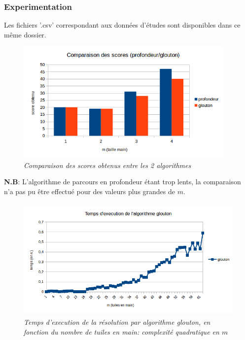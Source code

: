 \documentclass[10pt]{article}
\begin{document}
      \subsubsection{Experimentation}
	Les fichiers '.csv' correspondant aux données d'études sont disponibles dans ce même dossier.
	\begin{figure}[H]
	  \begin{center}
	    \includegraphics[height=6cm,keepaspectratio]{./comparaison.png}
	  \end{center}
	  \caption{\textit{Comparaison des scores obtenus entre les 2 algorithmes}}
	\end{figure}
	\textbf{N.B}: L'algorithme de parcours en profondeur étant trop lents, la comparaison n'a pas pu être effectué pour des valeurs plus grandes de $m$.
	
  	\begin{figure}[H]
	  \begin{center}
	    \includegraphics[height=6cm,keepaspectratio]{./glouton.png}
	  \end{center}
	  \caption{\textit{Temps d'execution de la résolution par algorithme glouton, en fonction du nombre de tuiles en main: complexité quadratique en $m$}}
	\end{figure}
	
\end{document}
